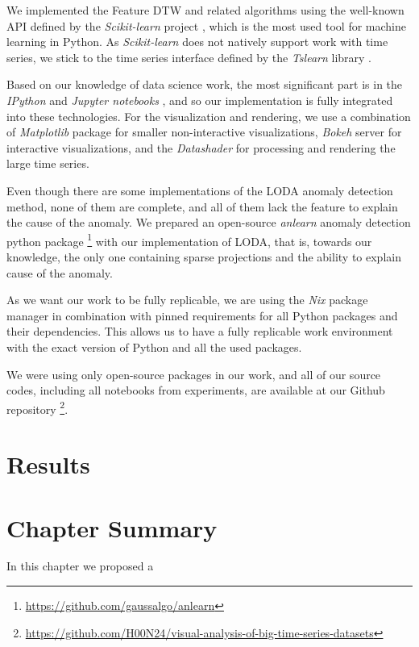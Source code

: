We implemented the Feature DTW and related algorithms using the well-known API defined by the \textit{Scikit-learn} project \cite{exp:sklearn_api,exp:scikit-learn}, which is the most used tool for machine learning in Python. As \textit{Scikit-learn} does not natively support work with time series, we stick to the time series interface defined by the \textit{Tslearn} library \cite{exp:tslearn}.

Based on our knowledge of data science work, the most significant part is in the \textit{IPython} \cite{exp:ipython} and \textit{Jupyter notebooks} \cite{exp:jupyter}, and so our implementation is fully integrated into these technologies. For the visualization and rendering, we use a combination of \textit{Matplotlib} package \cite{exp:matplotlib} for smaller non-interactive visualizations, \textit{Bokeh} server \cite{exp:bokeh} for interactive visualizations, and the \textit{Datashader} \cite{vis:datashader} for processing and rendering the large time series.

Even though there are some implementations of the LODA anomaly detection method, none of them are complete, and all of them lack the feature to explain the cause of the anomaly. We prepared an open-source \textit{anlearn} anomaly detection python package \footnote{\url{https://github.com/gaussalgo/anlearn}} with our implementation of LODA, that is, towards our knowledge, the only one containing sparse projections and the ability to explain cause of the anomaly.

As we want our work to be fully replicable, we are using the \textit{Nix} package manager \cite{exp:dolstra2008nixos} in combination with pinned requirements for all Python packages and their dependencies. This allows us to have a fully replicable work environment with the exact version of Python and all the used packages.

We were using only open-source packages in our work, and all of our source codes, including all notebooks from experiments, are available at our Github repository \footnote{\url{https://github.com/H00N24/visual-analysis-of-big-time-series-datasets}}.

\section{Results}

\section{Chapter Summary}
In this chapter we proposed a 